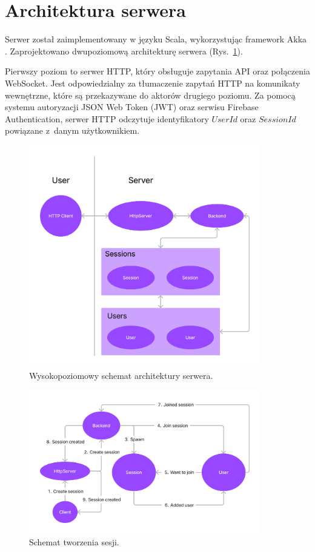 \FloatBarrier


\section{Architektura serwera}

Serwer został zaimplementowany w języku Scala,
wykorzystując framework Akka \cite{Akka}.
Zaprojektowano dwupoziomową architekturę serwera
(Rys.~\ref{fig:akka-highlevel}).

Pierwszy poziom to serwer HTTP, który obsługuje
zapytania API oraz połączenia WebSocket.
Jest odpowiedzialny za tłumaczenie zapytań HTTP na
komunikaty wewnętrzne, które są przekazywane do
aktorów drugiego poziomu.
Za pomocą systemu autoryzacji JSON Web Token (JWT)
oraz serwisu Firebase Authentication,
serwer HTTP odczytuje identyfikatory $UserId$ oraz
$SessionId$ powiązane z~danym użytkownikiem.

\begin{figure}[hp!]
    \centering
    \includegraphics[width=0.9\textwidth]{img/akka/HighLevel.png}
    \caption{Wysokopoziomowy schemat architektury serwera.}
    \label{fig:akka-highlevel}
\end{figure}

\begin{figure}[hp!]
    \centering
    \includegraphics[width=0.9\textwidth]{img/akka/CreateSession.png}
    \caption{Schemat tworzenia sesji.}
    \label{fig:akka-createsession}
\end{figure}

